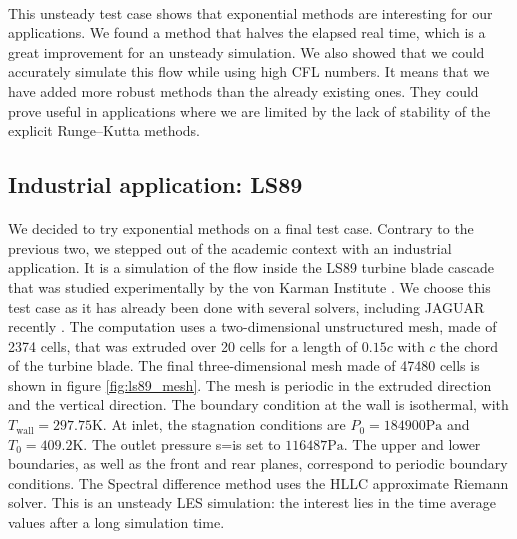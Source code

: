       \paragraph{}
      This unsteady test case shows that exponential methods are interesting for our applications.
      We found a method that halves the elapsed real time, which is a great improvement for an unsteady simulation.
      We also showed that we could accurately simulate this flow while using high CFL numbers.
      It means that we have added more robust methods than the already existing ones.
      They could prove useful in applications where we are limited by the lack of stability of the explicit Runge--Kutta methods.


    \subsection{Industrial application: LS89}

      \paragraph{}
      We decided to try exponential methods on a final test case.
      Contrary to the previous two, we stepped out of the academic context with an industrial application.
      It is a simulation of the flow inside the LS89 turbine blade cascade that was studied experimentally by the von Karman Institute \cite{ArtsLambertdeRouvroit1992}.
      We choose this test case as it has already been done with several solvers, including JAGUAR recently \cite{BrunetCronerMinotEtAl2018}.
      The computation uses a two-dimensional unstructured mesh, made of \num{2374} cells, that was extruded over 20 cells for a length of $0.15 c$ with $c$ the chord of the turbine blade.
      The final three-dimensional mesh made of \num{47480} cells is shown in figure \ref{fig:ls89_mesh}.
      The mesh is periodic in the extruded direction and the vertical direction.
      The boundary condition at the wall is isothermal, with $T_\textrm{wall} = 297.75 \si{\kelvin}$.
      At inlet, the stagnation conditions are $P_0 = \num{184900}\si{\pascal}$ and $T_0 = 409.2\si{\kelvin}$.
      The outlet pressure s=is set to $\num{116487}\si{\pascal}$.
      The upper and lower boundaries, as well as the front and rear planes, correspond to periodic boundary conditions.
      The Spectral difference method uses the HLLC approximate Riemann solver.
      This is an unsteady LES simulation: the interest lies in the time average values after a long simulation time.

